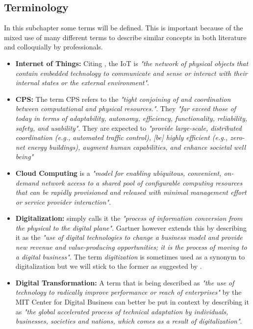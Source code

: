 \subsection{Terminology}
In this subchapter some terms will be defined. This is important because of the mixed use of many different terms to describe similar concepts in both literature and colloquially by professionals.

\begin{itemize}

\item \textbf{Internet of Things:} Citing \citeauthor{iot-def:2016}, the \ac{IoT} is \emph{"the network of physical objects that contain embedded technology to communicate and sense or interact with their internal states or the external environment"}.


  \item \textbf{\acl{CPS}:} The term \ac{CPS} refers to the \emph{"tight conjoining of and coordination between computational and physical resources."}. They \emph{"far exceed those of today in terms of adaptability, autonomy, efficiency, functionality, reliability, safety, and usability"}. They are expected to \emph{"provide large-scale, distributed coordination (e.g., automated traffic control), [be] highly efficient (e.g., zero-net energy buildings), augment human capabilities, and enhance societal well being"}  \cite{cps:nsf:2011}

  \item \textbf{Cloud Computing} is a \emph{"model for enabling ubiquitous, convenient, on-demand network access to a shared pool of configurable computing resources that can be rapidly provisioned and released with minimal management effort or service provider interaction"}\cite{Mell:2011:SND:2206223}.

  \item \textbf{Digitalization:} \citeauthor{khan-digital:2016} simply calls it the \emph{"process of information conversion from the physical to the digital plane"}. Gartner however extends this by describing it as the \emph{"use of digital technologies to change a business model and provide new revenue and value-producing opportunities; it is the process of moving to a digital business"}. The term \emph{digitization} is sometimes used as a synonym to digitalization but we will stick to the former as suggested by \citeauthor{khan-digital:2016}.

  \item \textbf{Digital Transformation:} A term that is being described as \emph{"the use of technology to radically improve performance or reach of enterprises"}\cite{westerman2011digital} by the MIT Center for Digital Business can better be put in context by describing it as \emph{"the global accelerated process of technical adaptation by individuals, businesses, societies and nations, which comes as a result of digitalization"}\cite{bonnect2014leading,khan-digital:2016}.


\end{itemize}

